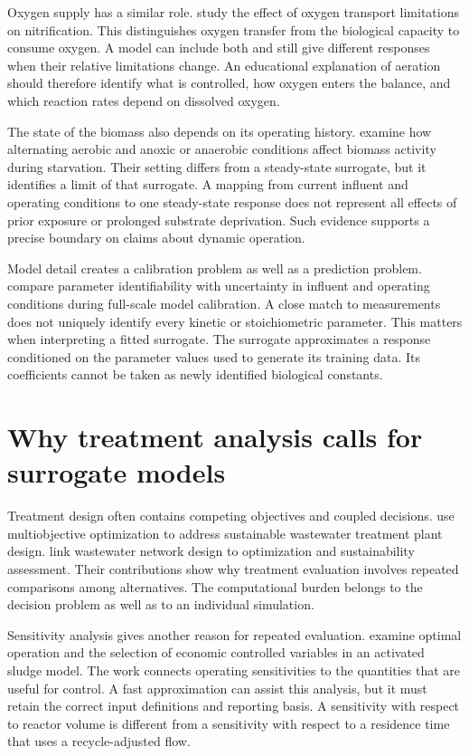Oxygen supply has a similar role. \citet{StenstromSong1991} study the effect of oxygen transport limitations on nitrification. This distinguishes oxygen transfer from the biological capacity to consume oxygen. A model can include both and still give different responses when their relative limitations change. An educational explanation of aeration should therefore identify what is controlled, how oxygen enters the balance, and which reaction rates depend on dissolved oxygen.

The state of the biomass also depends on its operating history. \citet{Yilmaz2007} examine how alternating aerobic and anoxic or anaerobic conditions affect biomass activity during starvation. Their setting differs from a steady-state surrogate, but it identifies a limit of that surrogate. A mapping from current influent and operating conditions to one steady-state response does not represent all effects of prior exposure or prolonged substrate deprivation. Such evidence supports a precise boundary on claims about dynamic operation.

Model detail creates a calibration problem as well as a prediction problem. \citet{Machado2014} compare parameter identifiability with uncertainty in influent and operating conditions during full-scale model calibration. A close match to measurements does not uniquely identify every kinetic or stoichiometric parameter. This matters when interpreting a fitted surrogate. The surrogate approximates a response conditioned on the parameter values used to generate its training data. Its coefficients cannot be taken as newly identified biological constants.

\section{Why treatment analysis calls for surrogate models}

Treatment design often contains competing objectives and coupled decisions. \citet{PadronPaez2020} use multiobjective optimization to address sustainable wastewater treatment plant design. \citet{Aboagye2021} link wastewater network design to optimization and sustainability assessment. Their contributions show why treatment evaluation involves repeated comparisons among alternatives. The computational burden belongs to the decision problem as well as to an individual simulation.

Sensitivity analysis gives another reason for repeated evaluation. \citet{Araujo2013} examine optimal operation and the selection of economic controlled variables in an activated sludge model. The work connects operating sensitivities to the quantities that are useful for control. A fast approximation can assist this analysis, but it must retain the correct input definitions and reporting basis. A sensitivity with respect to reactor volume is different from a sensitivity with respect to a residence time that uses a recycle-adjusted flow.

